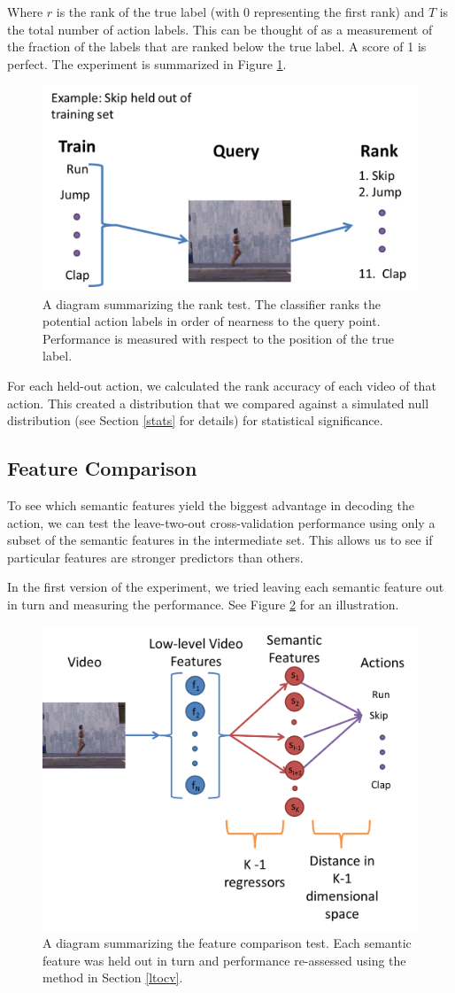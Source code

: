 \documentclass{article}
\begin{document}
Where $r$ is the rank of the true label (with $0$ representing the first rank) and $T$ is the total number of action labels.  This can be thought of as a measurement of the fraction of the labels that are ranked below the true label. A score of 1 is perfect. The experiment is summarized in Figure \ref{ranking}.

\begin{figure}[h]
  \centering
  \includegraphics[width = .45\linewidth]{ranking}
  \caption{A diagram summarizing the rank test. The classifier ranks the potential action labels in order of nearness to the query point. Performance is measured with respect to the position of the true label.}
  \label{ranking}
\end{figure}
\label{rank}

For each held-out action, we calculated the rank accuracy of each video of that action. This created a distribution that we compared against a simulated null distribution (see Section \ref{stats} for details) for statistical significance.

\subsection{Feature Comparison}
To see which semantic features yield the biggest advantage in decoding the action, we can test the leave-two-out cross-validation performance using only a subset of the semantic features in the intermediate set. This allows us to see if particular features are stronger predictors than others.

In the first version of the experiment, we tried leaving each semantic feature out in turn and measuring the performance. See Figure \ref{feature} for an illustration.

\begin{figure}[h]
  \centering
  \includegraphics[width = .45\linewidth]{features}
  \caption{A diagram summarizing the feature comparison test. Each semantic feature was held out in turn and performance re-assessed using the method in Section \ref{ltocv}.}
  \label{feature}
\end{figure}
\end{document}
